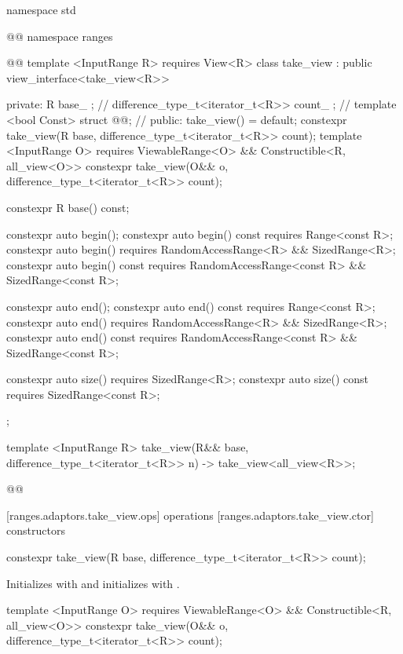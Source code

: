 \begin{codeblock}
namespace std { @@ namespace ranges { @@
  template <InputRange R>
    requires View<R>
  class take_view : public view_interface<take_view<R>> {
  private:
    R base_ {}; // \expos
    difference_type_t<iterator_t<R>> count_ {}; // \expos
    template <bool Const>
      struct @@; // \expos
  public:
    take_view() = default;
    constexpr take_view(R base, difference_type_t<iterator_t<R>> count);
    template <InputRange O>
      requires ViewableRange<O> && Constructible<R, all_view<O>>
    constexpr take_view(O&& o, difference_type_t<iterator_t<R>> count);

    constexpr R base() const;

    constexpr auto begin();
    constexpr auto begin() const requires Range<const R>;
    constexpr auto begin() requires RandomAccessRange<R> && SizedRange<R>;
    constexpr auto begin() const
      requires RandomAccessRange<const R> && SizedRange<const R>;

    constexpr auto end();
    constexpr auto end() const requires Range<const R>;
    constexpr auto end() requires RandomAccessRange<R> && SizedRange<R>;
    constexpr auto end() const
      requires RandomAccessRange<const R> && SizedRange<const R>;

    constexpr auto size() requires SizedRange<R>;
    constexpr auto size() const requires SizedRange<const R>;
  };

  template <InputRange R>
  take_view(R&& base, difference_type_t<iterator_t<R>> n)
    -> take_view<all_view<R>>;
}}@\removed{\}\}}@
\end{codeblock}

[ranges.adaptors.take_view.ops]{ operations}
[ranges.adaptors.take_view.ctor]{ constructors}

%
\begin{itemdecl}
constexpr take_view(R base, difference_type_t<iterator_t<R>> count);
\end{itemdecl}

\begin{itemdescr}
\pnum
\effects Initializes  with  and initializes
 with .
\end{itemdescr}

%
\begin{itemdecl}
template <InputRange O>
  requires ViewableRange<O> && Constructible<R, all_view<O>>
constexpr take_view(O&& o, difference_type_t<iterator_t<R>> count);
\end{itemdecl}

